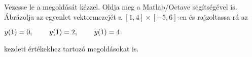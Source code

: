 Vezesse le a
\de{} megoldását kézzel.
Oldja meg a Matlab/Octave   segítségével is.
Ábrázolja az egyenlet vektormezejét a $[1,4]\times [-5,6]$-en és rajzoltassa rá
az
\centerline{$y(1)=0, \hspace{0.8cm} y(1)=2, \hspace{0.8cm} y(1)=4$}
kezdeti értékekhez tartozó megoldásokat is.


